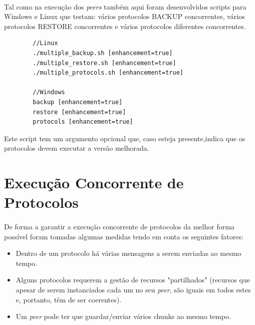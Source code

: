 \documentclass[11pt,oneside]{book}
\begin{document}
    \paragraph{}
    Tal como na execução dos \textit{peers} também aqui foram desenvolvidos scripts para
    Windows e Linux que testam: vários protocolos BACKUP concorrentes, vários protocolos 
    RESTORE concorrentes e vários protocolos diferentes concorrentes.
    \begin{lstlisting}
        //Linux
        ./multiple_backup.sh [enhancement=true]
        ./multiple_restore.sh [enhancement=true]
        ./multiple_protocols.sh [enhancement=true]

        //Windows
        backup [enhancement=true]
        restore [enhancement=true]
        protocols [enhancement=true]
    \end{lstlisting}
    Este script tem um argumento opcional que, caso esteja presente,indica que os 
    protocolos devem executar a versão melhorada.

\pagebreak

\section{Execução Concorrente de Protocolos}
\paragraph{}
    De forma a garantir a execução concorrente de protocolos da melhor forma
    possível foram tomadas algumas medidas tendo em conta os seguintes fatores:
    \begin{itemize}
        \item  Dentro de um protocolo há várias mensagens a serem enviadas ao mesmo tempo.
        \item  Alguns protocolos requerem a gestão de recursos "partilhados" (recursos que
        apesar de serem instanciados cada um no seu \textit{peer}, são iguais em todos estes e,
        portanto, têm de ser coerentes).
        \item  Um \textit{peer} pode ter que guardar/enviar vários chunks ao mesmo tempo.
    \end{itemize}
 
\end{document}
